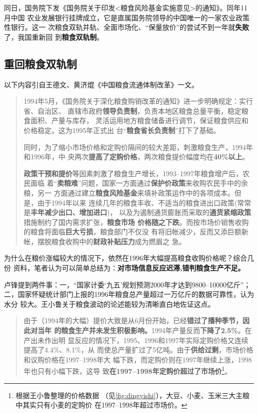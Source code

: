 同日，国务院下发《国务院关于印发<粮食风险基金实施意见>的通知》。同年11月中国
农业发展银行挂牌成立，它是直属国务院领导的中国唯一的一家农业政策性银行。这一
次粮食双轨并轨、全面市场化、“保量放价”的尝试不到一年就\textbf{失败}了，我国重新回
到\textbf{粮食双轨制}。


\subsection{重回粮食双轨制}

以下内容引自王德文、黄济焜《中国粮食流通体制改革》一文。
\begin{quotation}
  1994年5月，《国务院关于深化粮食购销改革的通知》进一步明确规定：实行省、自治区、
  直辖市政府\textbf{领导负责制}，负责本地区粮食总量平衡，稳定粮食面积、产量与库存，
  灵活运用地方粮食储备进行调节，保证粮食供应和价格稳定。这为1995年正式出
  台“\textbf{粮食省长负责制}”打下了基础。

  同时，为了缩小市场价格和定购价隔间的较大差距，刺激粮食生产，1994年和1996年，中
  央两次\textbf{提高了定购价格}，两次粮食提价幅度均在\textbf{40\%以上}。

  \textbf{政策干预和提价}等因素刺激了粮食生产增长，1993--1997年粮食增产后，农民面临
  着“\textbf{卖粮难}”问题，国家一方面通过\textbf{保护价政策}来收购农民手中的余粮，另一
  方面通过建立\textbf{粮食风险基金}来填补政策运作中的各项成本。但是，由于1994年以来
  连续几年的粮食丰收、不适当的粮食进出口政策(常常是\textbf{丰年减少出口、增加进口})，
  以及为遏制通货膨胀而采取的\textbf{通货紧缩政策}措施制约了国内需求扩张，\textbf{粮食市场
    价格随之下跌}。而按市场价销售收购的粮食将面临\textbf{巨大亏损}，粮食部门不仅没
  有将旧帐减少，反而又添巨额新帐，摆脱粮食收购中的\textbf{财政补贴压力}成为燃眉之
  急。
\end{quotation}

为什么在粮价涨幅较大的情况下，依然在1996年大幅提高粮食收购价格呢？综合几份
资料，笔者认为可以简单总结为：\textbf{对市场信息反应迟滞,错判粮食生产不足。}

卢锋提到两件事：一，“国家计委‘九五’规划预测2000年才达到9800--10000亿斤”；
二，国家怀疑统计部门上报的1996年粮食总产量超过一万亿斤的数据可靠性，认为水分
较大。王小鲁关于粮食波动的论述能较为清晰直白地佐证这点。
\begin{quotation}
  由于（1994年的大幅）提价大致是从6月份开始，已经\textbf{错过了播种季节，因此对当年
    的粮食生产并未发生积极影响。}1994年产量反而\textbf{下降了2.5\%}。在产出未作出明
  显反应的情况下，1995、1996和1997年实际定购价格又连续提高了4.4\%、8.1\%，从
  而使总产量扩过了5亿吨。由于\textbf{供给过剩}，市场价格和议购价格在1997--1998年大
  幅下跌，而定购价则在1997年继续上涨，1998年也只有小幅下跌，这导
  致\textbf{在1997--1998年定购价超过了市场价}\footnote{根据王小鲁整理的价格数据
    （见\cref{fig:dingyishi}），大豆、小麦、玉米三大主粮中其实只有小麦的定购价
    在1997--1998年超过市场价。}。\cite{wangxiaoluliangshi}
\end{quotation}

